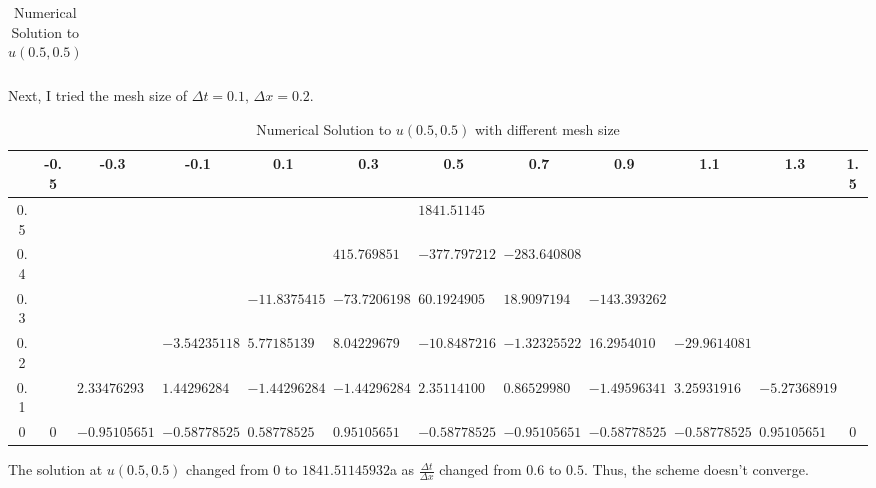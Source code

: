 \begin{answer}
\begin{table}[H]
\begin{adjustbox}{width=\columnwidth,center}
\begin{tabular}{|c|c|c|c|c|c|c|c|c|c|c|c|c|c|}
\end{tabular}
\end{adjustbox}
\caption{Numerical Solution to $u(0.5,0.5)$}
\label{tab:tab3}
\end{table}
    Next, I tried the mesh size of $\Delta t = 0.1, \, \Delta x =0.2$.
    \begin{table}[H]
\centering
\begin{adjustbox}{width=\columnwidth,center}
\begin{tabular}{|c|c|c|c|c|c|c|c|c|c|c|c|}
\hline
\textbf{} & -0.5 & -0.3           & -0.1           & 0.1            & 0.3            & 0.5            & 0.7            & 0.9            & 1.1            & 1.3            & 1.5 \\ \hline
0.5       &      &                &                &                &                & $1841.51145932$  &                &                &                &                &     \\ \hline
0.4       &      &                &                &                & $415.769851672$  & $-377.797212984$ & $-283.64080872$  &                &                &                &     \\ \hline
0.3       &      &                &                & $-11.8375415536$ & $-73.7206198039$ & $60.1924905361$  & $18.9097194682$  & $-143.393262875$ &                &                &     \\ \hline
0.2       &      &                & $-3.54235118344$ & $5.77185139664$  & $8.04229679664$  & $-10.8487216503$ & $-1.32325522267$ & $16.2954010813$  & $-29.9614081971$ &                &     \\ \hline
0.1       &      & $2.33476293444$  & $1.44296284916$  & $-1.44296284916$ & $-1.44296284916$ & $2.35114100916$  & $0.86529980371$  & $-1.49596341229$ & $3.25931916916$  & $-5.27368919588$ &     \\ \hline
0         & 0    & $-0.95105651629$ & $-0.58778525229$ & $0.58778525229$  & $0.95105651629$  & $-0.58778525229$ & $-0.95105651629$ & $-0.58778525229$ & $-0.58778525229$ & $0.95105651629$  & 0   \\ \hline
\end{tabular}
\end{adjustbox}
\caption{Numerical Solution to $u(0.5,0.5)$ with different mesh size}
\label{tab:tab4}
\end{table}
The solution at $u(0.5,0.5)$ changed from $0$ to $1841.51145932$a as $\tfrac{\Delta t}{\Delta x}$ changed from $0.6$ to $0.5$. Thus, the scheme doesn't converge.
\end{answer}
